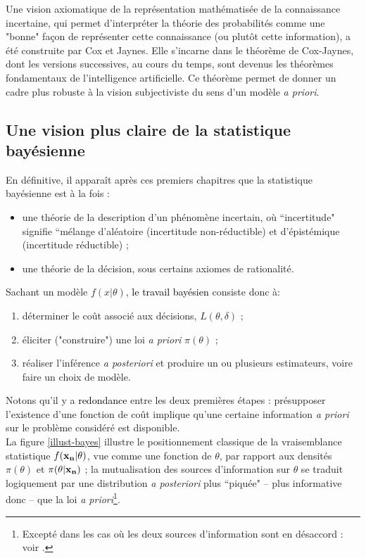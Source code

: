Une vision axiomatique de la représentation mathématisée de la connaissance incertaine, qui permet d'interpréter la théorie des probabilités comme une "bonne" fa\c con de représenter cette connaissance (ou plutôt cette information), a été construite par Cox et Jaynes. Elle s'incarne dans le théorème de Cox-Jaynes, dont les versions successives, au cours du temps, sont devenus les théorèmes fondamentaux de l'intelligence artificielle. Ce théorème permet de donner un cadre plus robuste à la vision subjectiviste du sens d'un modèle {\it a priori}. \\

\subsection{Une vision plus claire de la statistique bayésienne}

En définitive, il apparaît après ces premiers chapitres que la {statistique bayésienne} est à la fois :
\begin{itemize}
\item une théorie de la description d'un phénomène incertain, où ``incertitude" signifie ``mélange d'aléatoire (incertitude non-réductible) et d'épistémique (incertitude réductible) ;
\item une théorie de la décision, sous certains axiomes de rationalité.
\end{itemize}

Sachant un modèle $f(x|\theta)$, \textcolor{black}{le travail bayésien} consiste donc à:
\begin{enumerate}
\item déterminer le co\^ut associé aux décisions, $L(\theta,\delta)$ ;
\item éliciter ("construire") une loi {\it a priori} $\pi(\theta)$ ; 
\item réaliser l'inférence {\it a posteriori} et produire un ou plusieurs estimateurs, voire faire un choix de modèle. 
\end{enumerate}


Notons qu'il y a \textcolor{black}{redondance} entre les deux premières étapes : 
 présupposer l'existence d'une fonction de co\^ut implique qu'une certaine information {\it a priori} sur le problème considéré est disponible. \\
 
 La figure \ref{illust-bayes} illustre le positionnement classique de la vraisemblance statistique $f({\bf x_n}|\theta)$, vue comme une fonction de $\theta$, par rapport aux densit\'es $\pi(\theta)$ et $\pi(\theta|{\bf x_n})$ ; la mutualisation des sources d'information sur $\theta$ se traduit logiquement par une distribution {\it a posteriori} plus ``piqu\'ee" -- plus informative donc -- que la loi {\it a priori}\footnote{Except\'e dans les cas o\`u les deux sources d'information sont en d\'esaccord : voir \cite{Evans2006}.}. \\



